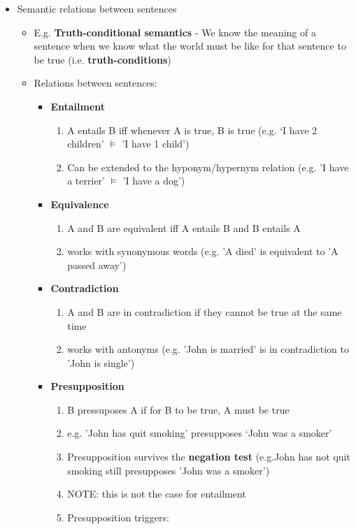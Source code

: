 \documentclass[11pt]{article}
\newenvironment{itemise}{
\begin{itemize}
  \setlength{\itemsep}{1pt}
  \setlength{\parskip}{0pt}
  \setlength{\parsep}{0pt}
}{\end{itemize}}
\begin{document}
\begin{itemise}
\begin{itemise}
\begin{itemise}
\begin{itemise}
      \end{itemise}
    \end{itemise}
   \item Semantic relations between sentences
    \begin{itemise}
     \item E.g. {\bf Truth-conditional semantics} - We know the meaning of a sentence when we know what the world must be like for that sentence to be true (i.e. {\bf truth-conditions})
     \item Relations between sentences:
      \begin{itemise}
       \item {\bf Entailment}
	\begin{enumerate}
	 \item A entails B iff whenever A is true, B is true (e.g. `I have 2 children' $\models$ 'I have 1 child')
	 \item Can be extended to the hyponym/hypernym relation (e.g. 'I have a terrier' $\models$ 'I have a dog')
	\end{enumerate}
       \item {\bf Equivalence}
	\begin{enumerate}
	 \item A and B are equivalent iff A entails B and B entails A
	 \item works with synonymous words (e.g. 'A died' is equivalent to 'A passed away')
	\end{enumerate}
       \item {\bf Contradiction}
	\begin{enumerate}
	 \item A and B are in contradiction if they cannot be true at the same time
         \item works with antonyms (e.g. 'John is married' is in contradiction to 'John is single')
	\end{enumerate}
       \item {\bf Presupposition}
	\begin{enumerate}
	 \item B pressuposes A if for B to be true, A must be true
	 \item e.g. 'John has quit smoking' presupposes `John was a smoker'
	 \item Presupposition survives the {\bf negation test} (e.g.John has not quit smoking still presupposes 'John was a smoker')
	 \item NOTE: this is not the case for entailment
	 \item Presupposition triggers:

\end{enumerate}
\end{itemise}
\end{itemise}
\end{itemise}
\end{itemise}
\end{document}
